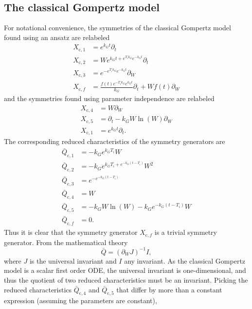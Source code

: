\subsection{The classical Gompertz model}

For notational convenience, the symmetries of the classical Gompertz model found using an ansatz are relabeled
\begin{align}
  X_{\text{c},1} &= e^{k_{G} t} \partial_t \\
  X_{\text{c},2} &= W e^{k_{G} t + e^{T_{i} k_{G}} e^{- k_{G} t}} \partial_t \\
  X_{\text{c},3} &= e^{- e^{T_{i} k_{G}} e^{- k_{G} t}} \partial_W \\
  X_{\text{c},f} &= \frac{f{\left(t \right)} e^{- T_{i} k_{G}} e^{k_{G} t}}{k_{G}} \partial_t + W f{\left(t \right)} \partial_W
\end{align}
and the symmetries found using parameter independence are relabeled
\begin{align}
  X_{\text{c},4} &= W \partial_W \\
  X_{\text{c},5} &= \partial_t - k_G W \ln(W) \partial_W \\
  X_{\text{c},1} &= e^{k_G t} \partial_t.
\end{align}
The corresponding reduced characteristics of the symmetry generators are
\begin{align}
  \bar{Q}_{\text{c},1} &= -k_G e^{k_G T_i} W \\
  \bar{Q}_{\text{c},2} &= - k_G e^{k_{G} T_i + e^{-k_G (t - T_i)}} W^2 \\
  \bar{Q}_{\text{c},3} &= e^{- e^{- k_{G} \left(t - T_{i}\right)}} \\
  \bar{Q}_{\text{c},4} &= W \\
  \bar{Q}_{\text{c},5} &= - k_G W \ln(W) - k_G e^{-k_G (t - T_i)} W \\
  \bar{Q}_{\text{c},f} &= 0.
\end{align}
Thus it is clear that the symmetry generator \(X_{\text{c},f}\) is a trivial symmetry generator.
From the mathematical theory
\begin{equation}
  \bar{Q} = (\partial_W J)^{-1} I,
\end{equation}
where \(J\) is the universal invariant and \(I\) any invariant.
As the classical Gompertz model is a scalar first order ODE, the universal invariant is one-dimensional, and thus the quotient of two reduced characteristics must be an invariant.
Picking the reduced characteristics \(\bar{Q}_{\text{c},4}\) and \(\bar{Q}_{\text{c},5}\) that differ by more than a constant expression (assuming the parameters are constant),
